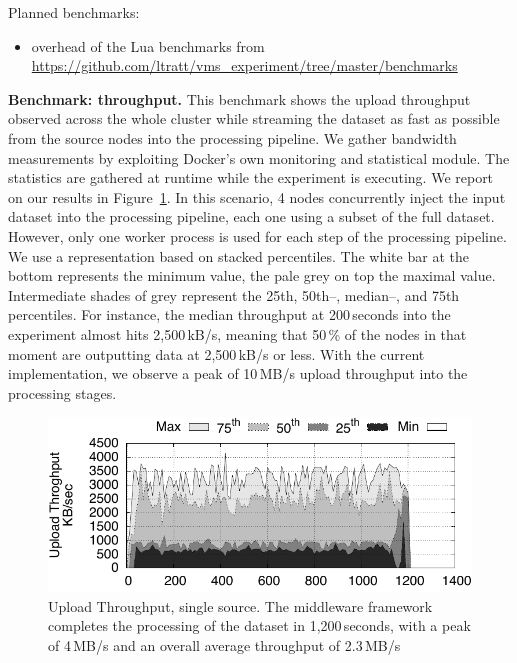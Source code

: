 Planned benchmarks:
\begin{itemize}
	\item overhead of the Lua benchmarks from \url{https://github.com/ltratt/vms_experiment/tree/master/benchmarks}
\end{itemize}
\textbf{Benchmark: throughput.}
This benchmark shows the upload throughput observed across the whole cluster while streaming the dataset as fast as possible from the source nodes into the processing pipeline.
We gather bandwidth measurements by exploiting Docker's own monitoring and statistical module.
The statistics are gathered at runtime while the experiment is executing.
We report on our results in Figure~\ref{fig:throughput}.
In this scenario, 4 nodes concurrently inject the input dataset into the processing pipeline, each one using a subset of the full dataset.
However, only one worker process is used for each step of the processing pipeline.
We use a representation based on stacked percentiles.
The white bar at the bottom represents the minimum value, the pale grey on top the maximal value.
Intermediate shades of grey represent the 25th, 50th–, median–, and 75th percentiles.
For instance, the median throughput at 200\,seconds into the experiment almost hits 2,500\,kB/s, meaning that 50\,\% of the nodes in that moment are outputting data at 2,500\,kB/s or less.
With the current implementation, we observe a peak of 10\,MB/s upload throughput into the processing stages.%


\begin{figure}[t!]
  \centering
  \includegraphics[scale=0.7]{images/tput_upload_4-datas-1-worker.pdf}
  \caption{Upload Throughput, single source. The middleware framework completes the processing of the dataset in 1,200\,seconds, with a peak of 4\,MB/s and an overall average throughput of 2.3\,MB/s}
  \label{fig:throughput}
\end{figure}

